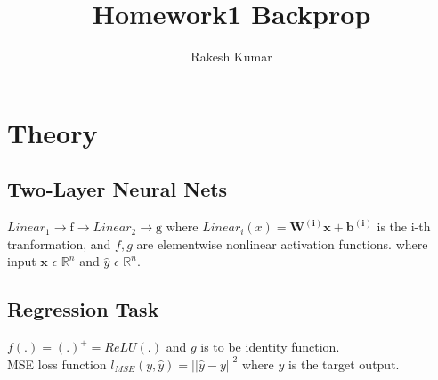 \documentclass[letterpaper,11pt]{article}
\title{Homework1 Backprop}
\author{Rakesh Kumar}
\begin{document}
\maketitle
\hrulefill
\section{Theory}
\subsection{Two-Layer Neural Nets}


   $ Linear_1 \rightarrow \mathrm{f} \rightarrow Linear_2 \rightarrow \mathrm{g}$ 
   where $Linear_i(x) = \mathbf{W^{(i)}} \mathbf{x} + \mathbf{b^{(i)}}$ is the i-th tranformation, and
   $f, g$ are elementwise nonlinear activation functions. 
   where input $\mathbf{x} \, \, \epsilon \,\, \mathbb{R}^{n} $ and 
   $\hat{y} \,\, \epsilon \,\, \mathbb{R}^{n}$.

   \subsection{Regression Task}
   $f(.) = (.)^{+} = ReLU(.)$ and $ g $ is to be identity function. \\
   MSE loss function $l_{MSE}(y, \hat{y}) = ||\hat{y} - y||^{2}$ where $y$ is the target output.
\end{document}
